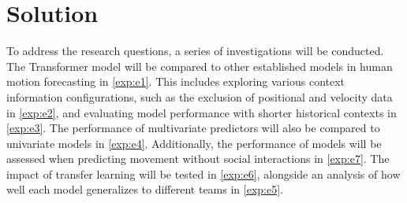 \section{Solution}
\label{sec:solution}
To address the research questions, a series of investigations will be conducted. The Transformer model will be compared to other established models in human motion forecasting in \ref{exp:e1}. This includes exploring various context information configurations, such as the exclusion of positional and velocity data in \ref{exp:e2}, and evaluating model performance with shorter historical contexts in \ref{exp:e3}. The performance of multivariate predictors will also be compared to univariate models in \ref{exp:e4}. Additionally, the performance of models will be assessed when predicting movement without social interactions in \ref{exp:e7}. The impact of transfer learning will be tested in \ref{exp:e6}, alongside an analysis of how well each model generalizes to different teams in \ref{exp:e5}.
